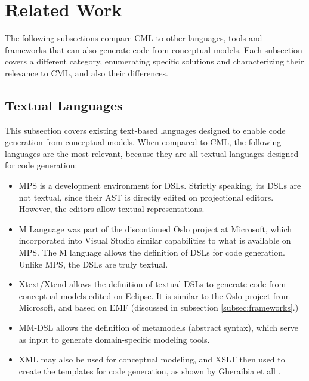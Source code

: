 \section{Related Work}\label{sec:related}

The following subsections compare CML to other languages, tools and frameworks
that can also generate code from conceptual models.
Each subsection covers a different category,
enumerating specific solutions and characterizing their relevance to CML, and also their differences. 

\subsection{Textual Languages}

This subsection covers existing text-based languages designed to enable code generation from conceptual models.
When compared to CML, the following languages are the most relevant,
because they are all textual languages designed for code generation:

\begin{itemize}

\item MPS \cite{voelter} is a development environment for DSLs.
Strictly speaking, its DSLs are not textual,
since their AST is directly edited on projectional editors.
However, the editors allow textual representations.

\item M Language \cite{mlang} was part of the discontinued Oslo project at Microsoft,
which incorporated into Visual Studio similar capabilities to what is available on MPS.
The M language allows the definition of DSLs for code generation. Unlike MPS, the DSLs are truly textual.

\item Xtext/Xtend \cite{xtext} allows the definition of textual DSLs to generate code from conceptual models
edited on Eclipse. It is similar to the Oslo project from Microsoft,
and based on EMF \cite{emf} (discussed in subsection \ref{subsec:frameworks}.)

\item MM-DSL \cite{mm-dsl} allows the definition of metamodels (abstract syntax),
which serve as input to generate domain-specific modeling tools.

\item XML may also be used for conceptual modeling,
and XSLT then used to create the templates for code generation,
as shown by Gheraibia et all \cite{xslt}.

\end{itemize}

